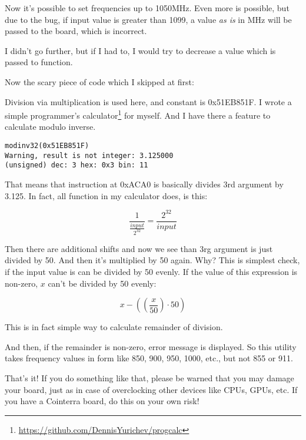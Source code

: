 Now it's possible to set frequencies up to 1050MHz. Even more is possible, but due to the bug, if input value is greater than 1099, a value \emph{as is} in MHz will be passed to the board, which is incorrect.

I didn't go further, but if I had to, I would try to decrease a value which is passed to  function.

Now the scary piece of code which I skipped at first:



Division via multiplication is used here, and constant is 0x51EB851F.
I wrote a simple programmer's calculator\footnote{\url{https://github.com/DennisYurichev/progcalc}} for myself.
And I have there a feature to calculate modulo inverse.

\begin{lstlisting}
modinv32(0x51EB851F)
Warning, result is not integer: 3.125000
(unsigned) dec: 3 hex: 0x3 bin: 11
\end{lstlisting}

That means that  instruction at 0xACA0 is basically divides 3rd argument by 3.125.
In fact, all  function in my calculator does, is this:

\[
\frac{1}{\frac{input}{2^{32}}} = \frac{2^{32}}{input}
\]

Then there are additional shifts and now we see than 3rg argument is just divided by 50.
And then it's multiplied by 50 again.
Why?
This is simplest check, if the input value is can be divided by 50 evenly.
If the value of this expression is non-zero, $x$ can't be divided by 50 evenly:

\[
x-((\frac{x}{50}) \cdot 50)
\]

This is in fact simple way to calculate remainder of division.

And then, if the remainder is non-zero, error message is displayed.
So this utility takes frequency values in form like 850, 900, 950, 1000, etc., but not 855 or 911.

That's it! If you do something like that, please be warned that you may damage your board, just as in case of overclocking other devices like \ac{CPU}s, \ac{GPU}s, etc.
If you have a Cointerra board, do this on your own risk!

